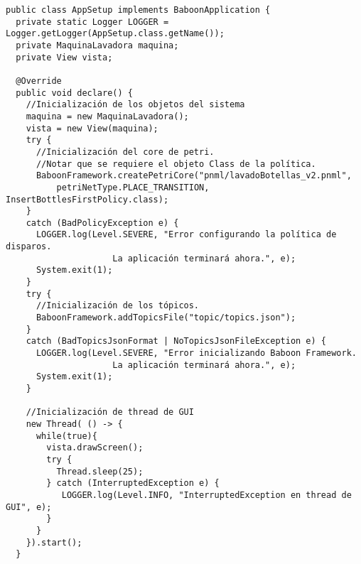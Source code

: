 \begin{verbatim}
public class AppSetup implements BaboonApplication {
  private static Logger LOGGER = Logger.getLogger(AppSetup.class.getName());
  private MaquinaLavadora maquina;
  private View vista;

  @Override
  public void declare() {
    //Inicialización de los objetos del sistema
    maquina = new MaquinaLavadora();
    vista = new View(maquina);
    try {
      //Inicialización del core de petri.
      //Notar que se requiere el objeto Class de la política.
      BaboonFramework.createPetriCore("pnml/lavadoBotellas_v2.pnml",
          petriNetType.PLACE_TRANSITION, InsertBottlesFirstPolicy.class);
    } 
    catch (BadPolicyException e) {
      LOGGER.log(Level.SEVERE, "Error configurando la política de disparos.
                     La aplicación terminará ahora.", e);
      System.exit(1);
    }
    try {
      //Inicialización de los tópicos.
      BaboonFramework.addTopicsFile("topic/topics.json");
    } 
    catch (BadTopicsJsonFormat | NoTopicsJsonFileException e) {
      LOGGER.log(Level.SEVERE, "Error inicializando Baboon Framework.
                     La aplicación terminará ahora.", e);
      System.exit(1);
    }

    //Inicialización de thread de GUI
    new Thread( () -> {
      while(true){
        vista.drawScreen();
        try {
          Thread.sleep(25);
        } catch (InterruptedException e) {
           LOGGER.log(Level.INFO, "InterruptedException en thread de GUI", e);
        }
      }
    }).start();
  }

\end{verbatim}

